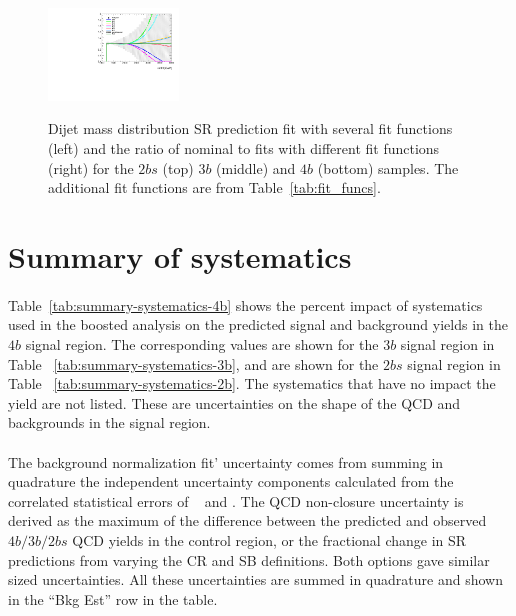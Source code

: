 \begin{figure}[htbp!]
\begin{center}
\includegraphics[width=0.31\textwidth,angle=-90]{figures/boosted/Syst_Smooth/smoothFuncCompare_44_comp_ratio.pdf} \\
\caption{ Dijet mass distribution SR prediction fit with several fit functions (left) and the ratio of nominal to fits with different fit functions (right)  for the $2bs$ (top) $3b$ (middle) and $4b$ (bottom) samples. The additional fit functions are from Table~\ref{tab:fit_funcs}.}
\label{fig:qcd_fit_funcs_sys}
\end{center}
\end{figure}


\section{Summary of systematics}
\label{sec:boosted-systematics-numbers}

\paragraph{}
Table~\ref{tab:summary-systematics-4b} shows the percent impact of systematics used in the boosted analysis on the predicted signal and background yields in the $4b$ signal region.
The corresponding values are shown for the $3b$ signal region in Table ~\ref{tab:summary-systematics-3b}, and are shown for the $2bs$ signal region in Table ~\ref{tab:summary-systematics-2b}.
The systematics that have no impact the yield are not listed. 
These are uncertainties on the shape of the QCD and \ttbar~ backgrounds in the signal region.

\paragraph{}
The background normalization fit' uncertainty comes from summing in quadrature the independent uncertainty components calculated from the correlated statistical errors of \muqcd~ and \alphatt. 
The QCD non-closure uncertainty is derived as the maximum of the difference between the predicted and observed $4b/3b/2bs$ QCD yields in the control region, or the fractional change in SR predictions from varying the CR and SB definitions.
Both options gave similar sized uncertainties. 
All these uncertainties are summed in quadrature and shown in the ``Bkg Est'' row in the table.

